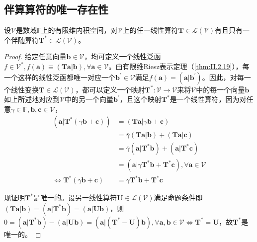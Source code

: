 \documentclass[main.tex]{subfiles}
\begin{document}
\subsection{伴算算符的唯一存在性}\label{sec:A.3.1}
\begin{theorem}\label{thm:A.6}
    设$\mathcal{V}$是数域$\mathbb{F}$上的有限维内积空间，对$\mathcal{V}$上的任一线性算符$\mathbf{T}\in\mathcal{L}\left(\mathcal{V}\right)$有且只有一个伴随算符$\mathbf{T}^*\in\mathcal{L}\left(\mathcal{V}\right)$。
\end{theorem}
\begin{proof}
    给定任意向量$\mathbf{b}\in\mathcal{V}$，均可定义一个线性泛函$f\in\mathcal{V}^*,f\left(\mathbf{a}\right)\equiv\left(\mathbf{Ta}|\mathbf{b}\right),\forall\mathbf{a}\in\mathcal{V}$。由有限维Riesz表示定理（\ref{thm:II.2.19}），每一个这样的线性泛函都唯一对应一个$\mathbf{b}^\prime\in\mathcal{V}$满足$f\left(\mathbf{a}\right)=\left(\mathbf{a}|\mathbf{b}^\prime\right)$。因此，对每一个线性变换$\mathbf{T}\in\mathcal{L}\left(\mathcal{V}\right)$，都可以定义一个映射$\mathbf{T}^*:\mathcal{V}\rightarrow\mathcal{V}$来将$\mathcal{V}$中的每一个向量$\mathbf{b}$如上所述地对应到$\mathcal{V}$中的另一个向量$\mathbf{b}^\prime$，且这个映射$\mathbf{T}^*$是一个线性算符，因为对任意$\gamma\in\mathbb{F},\mathbf{b},\mathbf{c}\in\mathcal{V}$，
    \begin{align*}
        \left(\mathbf{a}|\mathbf{T}^*\left(\gamma\mathbf{b}+\mathbf{c}\right)\right) & =\left(\mathbf{Ta}|\gamma\mathbf{b}+\mathbf{c}\right)                                                           \\
                                                                                     & =\overline{\gamma}\left(\mathbf{Ta}|\mathbf{b}\right)+\left(\mathbf{Ta}|\mathbf{c}\right)                       \\
                                                                                     & =\overline{\gamma}\left(\mathbf{a}|\mathbf{T}^*\mathbf{b}\right)+\left(\mathbf{a}|\mathbf{T}^*\mathbf{c}\right) \\
                                                                                     & =\left(\mathbf{a}|\gamma\mathbf{T}^*\mathbf{b}+\mathbf{T}^*\mathbf{c}\right),\forall\mathbf{a}\in\mathcal{V}    \\
        \Leftrightarrow\mathbf{T}^*\left(\gamma\mathbf{b}+\mathbf{c}\right)          & =\gamma\mathbf{T}^*\mathbf{b}+\mathbf{T}^*\mathbf{c}
    \end{align*}

    现证明$\mathbf{T}^*$是唯一的。设另一线性算符$\mathbf{U}\in\mathcal{L}\left(\mathcal{V}\right)$满足命题条件即$\left(\mathbf{Ta}|\mathbf{b}\right)=\left(\mathbf{a}|\mathbf{T}^*\mathbf{b}\right)=\left(\mathbf{a}|\mathbf{Ub}\right)$，则$0=\left(\mathbf{a}|\mathbf{T}^*\mathbf{b}\right)-\left(\mathbf{a}|\mathbf{Ub}\right)=\left(\mathbf{a}|\left(\mathbf{T}^*-\mathbf{U}\right)\mathbf{b}\right),\forall\mathbf{a},\mathbf{b}\in\mathcal{V}\Leftrightarrow\mathbf{T}^*=\mathbf{U}$，故$\mathbf{T}^*$是唯一的。
\end{proof}
\end{document}
